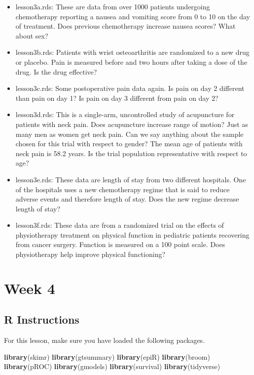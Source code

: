 \documentclass[]{book}
\newenvironment{Shaded}{\begin{snugshade}}{\end{snugshade}}
\newcommand{\KeywordTok}[1]{\textcolor[rgb]{0.13,0.29,0.53}{\textbf{#1}}}
\newcommand{\NormalTok}[1]{#1}
\providecommand{\tightlist}{%
  \setlength{\itemsep}{0pt}\setlength{\parskip}{0pt}}
\begin{document}
\begin{itemize}
\tightlist
\item
  lesson3a.rds: These are data from over 1000 patients undergoing chemotherapy reporting a nausea and vomiting score from 0 to 10 on the day of treatment. Does previous chemotherapy increase nausea scores? What about sex?
\item
  lesson3b.rds: Patients with wrist osteoarthritis are randomized to a new drug or placebo. Pain is measured before and two hours after taking a dose of the drug. Is the drug effective?
\item
  lesson3c.rds: Some postoperative pain data again. Is pain on day 2 different than pain on day 1? Is pain on day 3 different from pain on day 2?
\item
  lesson3d.rds: This is a single-arm, uncontrolled study of acupuncture for patients with neck pain. Does acupuncture increase range of motion? Just as many men as women get neck pain. Can we say anything about the sample chosen for this trial with respect to gender? The mean age of patients with neck pain is 58.2 years. Is the trial population representative with respect to age?
\item
  lesson3e.rds: These data are length of stay from two different hospitals. One of the hospitals uses a new chemotherapy regime that is said to reduce adverse events and therefore length of stay. Does the new regime decrease length of stay?
\item
  lesson3f.rds: These data are from a randomized trial on the effects of physiotherapy treatment on physical function in pediatric patients recovering from cancer surgery. Function is measured on a 100 point scale. Does physiotherapy help improve physical functioning?
\end{itemize}

\hypertarget{week-4}{%
\chapter{Week 4}\label{week-4}}

\hypertarget{r-instructions-3}{%
\section{R Instructions}\label{r-instructions-3}}

For this lesson, make sure you have loaded the following packages.

\begin{Shaded}
\begin{Highlighting}[]
\KeywordTok{library}\NormalTok{(skimr)}
\KeywordTok{library}\NormalTok{(gtsummary)}
\KeywordTok{library}\NormalTok{(epiR)}
\KeywordTok{library}\NormalTok{(broom)}
\KeywordTok{library}\NormalTok{(pROC)}
\KeywordTok{library}\NormalTok{(gmodels)}
\KeywordTok{library}\NormalTok{(survival)}
\KeywordTok{library}\NormalTok{(tidyverse)}
\end{Highlighting}
\end{Shaded}
\end{document}
